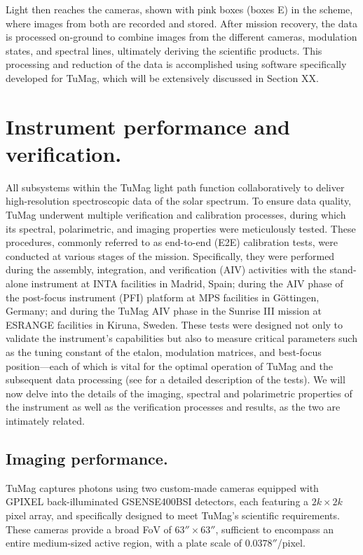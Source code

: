 Light then reaches the cameras, shown with pink boxes (boxes E) in the scheme, where images from both are recorded and stored. After mission recovery, the data is processed on-ground to combine images from the different cameras, modulation states, and spectral lines, ultimately deriving the scientific products. This processing and reduction of the data is accomplished using software specifically developed for TuMag, which will be extensively discussed in Section XX. 

\section{Instrument performance and verification.}

All subsystems within the TuMag light path function collaboratively to deliver high-resolution spectroscopic data of the solar spectrum. To ensure data quality, TuMag underwent multiple verification and calibration processes, during which its spectral, polarimetric, and imaging properties were meticulously tested. These procedures, commonly referred to as end-to-end (E2E) calibration tests, were conducted at various stages of the mission. Specifically, they were performed during the assembly, integration, and verification (AIV) activities with the stand-alone instrument at INTA facilities in Madrid, Spain; during the AIV phase of the post-focus instrument (PFI) platform at MPS facilities in Göttingen, Germany; and during the TuMag AIV phase in the Sunrise III mission at ESRANGE facilities in Kiruna, Sweden. These tests were designed not only to validate the instrument's capabilities but also to measure critical parameters such as the tuning constant of the etalon, modulation matrices, and best-focus position—each of which is vital for the optimal operation of TuMag and the subsequent data processing (see \cite{e2e-tests-inta} for a detailed description of the tests). We will now delve into the details of the imaging, spectral and polarimetric properties of the instrument as well as the verification processes and results, as the two are intimately related.  

\subsection{Imaging performance.}
TuMag captures photons using two custom-made cameras \citep{tumag-cams} equipped with GPIXEL back-illuminated GSENSE400BSI detectors, each featuring a $2k \times 2k$ pixel array, and specifically designed to meet TuMag's scientific requirements. These cameras provide a broad FoV of $63'' \times 63''$, sufficient to encompass an entire medium-sized active region, with a plate scale of $0.0378''$/pixel.

